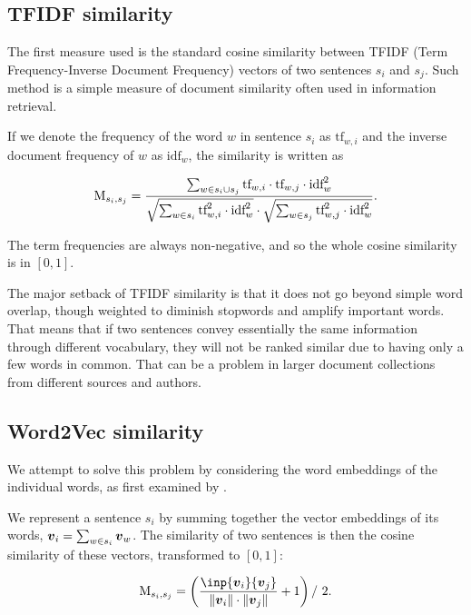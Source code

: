 \subsection{TFIDF similarity}

The first measure used is the standard cosine similarity between TFIDF (Term Frequency-Inverse Document Frequency) vectors \citep{information-retrieval} of two sentences $s_{i}$ and $s_{j}$. Such method is a simple measure of document similarity often used in information retrieval.

If we denote the frequency of the word $w$ in sentence $s_{i}$ as $\text{tf}_{w,i}$ and the inverse document frequency of $w$ as $\text{idf}_{w}$, the similarity is written as

\begin{equation}
	\text{M}_{s_{i}, s_{j}} = \frac{\sum_{w \in s_{i} \cup s_{j}} \text{tf}_{w,i} \cdot \text{tf}_{w,j} \cdot \text{idf}_{w}^{2}}{\sqrt{\sum_{w \in s_{i}} \text{tf}_{w, i}^{2} \cdot \text{idf}_{w}^{2}} \cdot \sqrt{\sum_{w \in s_{j}} \text{tf}_{w, j}^{2} \cdot \text{idf}_{w}^{2}}}.
\end{equation}

The term frequencies are always non-negative, and so the whole cosine similarity is in $[0, 1]$.

The major setback of TFIDF similarity is that it does not go beyond simple word overlap, though weighted to diminish stopwords and amplify important words. That means that if two sentences convey essentially the same information through different vocabulary, they will not be ranked similar due to having only a few words in common. That can be a problem in larger document collections from different sources and authors.

\subsection{Word2Vec similarity}

We attempt to solve this problem by considering the word embeddings of the individual words, as first examined by \cite{mogren-1}.

We represent a sentence $s_{i}$ by summing together the vector embeddings of its words, $\embed_{i} = \sum_{w \in s_{i}} \embed_{w}$. The similarity of two sentences is then the cosine similarity of these vectors, transformed to $[0, 1]$:

\begin{equation}
	\similarity_{s_{i}, s_{j}} = \left(\frac{\inp{\embed_{i}}{\embed_{j}}}{\| \embed_{i} \| \cdot \| \embed_{j} \|} + 1 \right) / \ 2.
\end{equation}

